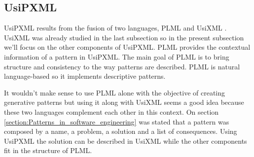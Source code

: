 \subsection{UsiPXML}
UsiPXML results from the fusion of two languages, PLML \cite{Pattern_Language_Markup_Language} and UsiXML \cite{Different_kinds_of_pattern_support_for_interactive_systems}. UsiXML was already studied in the last subsection so in the present subsection we’ll focus on the other components of UsiPXML.
PLML provides the contextual information of a pattern in UsiPXML. The main goal of PLML is to bring structure and consistency to the way patterns are described. PLML is natural language-based so it implements descriptive patterns. 

It wouldn't make sense to use PLML alone with the objective of creating generative patterns but using it along with UsiXML seems a good idea because these two languages complement each other in this context. On section \ref{section:Patterns_in_software_engineering} was stated that a pattern was composed by a name, a problem, a solution and a list of consequences. Using UsiPXML the solution can be described in UsiXML while the other components fit in the structure of PLML.

